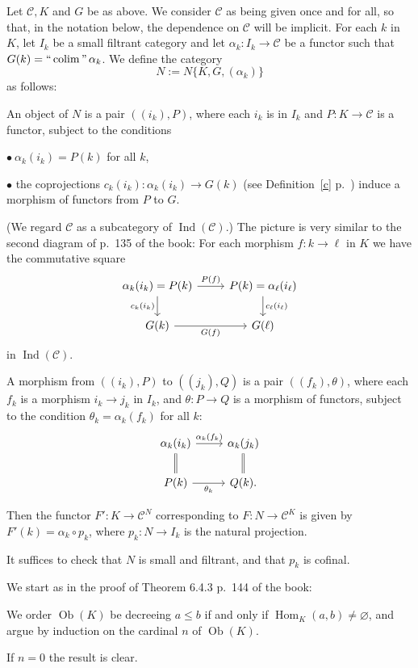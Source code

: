 \documentclass[12pt]{article}
\theoremstyle{remark}
\theoremstyle{definition}
\newcommand{\bu}{\bullet}
\newcommand{\C}{\mathcal C}
\DeclareMathOperator*{\coli}{colim}
\DeclareMathOperator*{\ic}{``\coli"}
\DeclareMathOperator{\Hom}{Hom}%
\DeclareMathOperator{\Ind}{Ind}
\DeclareMathOperator{\Ob}{Ob}
\begin{document}
Let $\C,K$ and $G$ be as above. We consider $\C$ as being given once and for all, so that, in the notation below, the dependence on $\C$ will be implicit. For each $k$ in $K$, let $I_k$ be a small filtrant category and let $\alpha_k:I_k\to\C$ be a functor such that $G(k)=\ic\alpha_k$. We define the category 
$$
N:=N\{K,G,(\alpha_k)\}
$$ 
as follows:

An object of $N$ is a pair $((i_k),P)$, where each $i_k$ is in $I_k$ and $P:K\to\C$ is a functor, subject to the conditions 

\noindent$\bu\ \alpha_k(i_k)=P(k)$ for all $k$, 

\noindent$\bu$ the coprojections $c_k(i_k):\alpha_k(i_k)\to G(k)$ (see Definition~\ref{c} p.~\pageref{c}) induce a morphism of functors from $P$ to $G$. 

\noindent(We regard $\C$ as a subcategory of $\Ind(\C)$.) The picture is very similar to the second diagram of p.~135 of the book: For each morphism $f:k\to\ell$ in $K$ we have the commutative square 
$$ 
\begin{tikzcd} 
\alpha_k(i_k)=P(k)\ar{r}{P(f)}\ar{d}[swap]{c_k(i_k)}&P(k)=\alpha_\ell(i_\ell)\ar{d}{c_\ell(i_\ell)}\\ 
G(k)\ar{r}[swap]{G(f)}&G(\ell) 
\end{tikzcd} 
$$ 
in $\Ind(\C)$. 

A morphism from $((i_k),P)$ to $((j_k),Q)$ is a pair $((f_k),\theta)$, where each $f_k$ is a morphism $i_k\to j_k$ in $I_k$, and $\theta:P\to Q$ is a morphism of functors, subject to the condition $\theta_k=\alpha_k(f_k)$ for all $k$: 
$$ 
\begin{tikzcd} 
\alpha_k(i_k)\ar{r}{\alpha_k(f_k)}\ar[equal]{d}&\alpha_k(j_k)\ar[equal]{d}\\ 
P(k)\ar{r}[swap]{\theta_k}&Q(k).
\end{tikzcd} 
$$ 

Then the functor $F':K\to\C^N$ corresponding to $F:N\to\C^K$ is given by $F'(k)=\alpha_k\circ p_k$, where $p_k:N\to I_k$ is the natural projection. 

It suffices to check that $N$ is small and filtrant, and that $p_k$ is cofinal. 

We start as in the proof of Theorem 6.4.3 p.~144 of the book: 

We order $\Ob(K)$ be decreeing $a\le b$ if and only if $\Hom_K(a,b)\neq\varnothing$, and argue by induction on the cardinal $n$ of $\Ob(K)$. 

If $n=0$ the result is clear.
\end{document}
